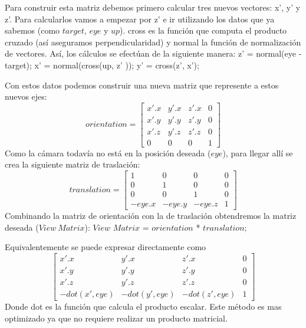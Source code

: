 \documentclass[a4paper]{article}
\begin{document}
Para construir esta matriz debemos primero calcular tres nuevos vectores: x', y' y z'. Para calcularlos vamos a empezar por z' e ir utilizando los datos que ya sabemos (como $target$, $eye$ y $up$). cross es la función que computa el producto cruzado (así aseguramos perpendicularidad) y normal la función de normalización de vectores. Así, los cálculos se efectúan de la siguiente manera: \newline \newline
    z'  = normal(eye - target); \newline 
    x' = normal(cross(up, z' )); \newline
    y' = cross(z', x');   \newline
    
    
Con estos datos podemos construir una nueva matriz que represente a estos nuevos ejes:
\[
orientation =
\begin{bmatrix}
x'.x & y'.x & z'.x & 0 \\
x'.y & y'.y & z'.y & 0 \\
x'.z & y'.z & z'.z & 0 \\
0 & 0 & 0 & 1      
\end{bmatrix} 
\]
Como la cámara todavía no está en la posición deseada ($eye$), para llegar allí se crea la siguiente matriz de traslación: \newline 
\[
translation =
\begin{bmatrix}
1 & 0 & 0 & 0 \\
0 & 1 & 0 & 0 \\ 
0 & 0 & 1 & 0 \\
-eye.x & -eye.y & -eye.z & 1 
\end{bmatrix}
\]
 Combinando la matriz de orientación con la de traslación obtendremos la matriz deseada ($View\ Matrix$):  \newline
  $View$ $Matrix$ = $orientation$ * $translation$;
  
  
Equivalentemente se puede expresar directamente como
\[
\begin{bmatrix}
x'.x & y'.x & z'.x & 0 \\ 
x'.y & y'.y & z'.y & 0 \\
x'.z & y'.z & z'.z & 0 \\
-dot(x', eye) & -dot(y', eye) & -dot(z', eye) & 1    
\end{bmatrix}
\]
Donde dot es la función que calcula el producto escalar. Este método es mas optimizado ya que no requiere realizar un producto matricial.
\end{document}
